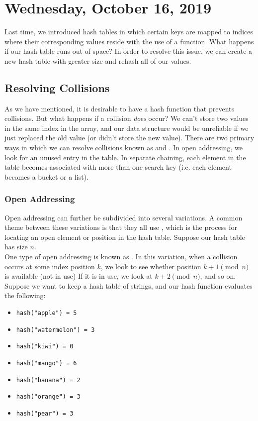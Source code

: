 \section{Wednesday, October 16, 2019}

Last time, we introduced hash tables in which certain keys are mapped to indices where their corresponding values reside with the use of a function. What happens if our hash table runs out of space? In order to resolve this issue, we can create a new hash table with greater size and rehash all of our values. 

\subsection{Resolving Collisions}

As we have mentioned, it is desirable to have a hash function that prevents collisions. But what happens if a collision \textit{does} occur? We can't store two values in the same index in the array, and our data structure would be unreliable if we just replaced the old value (or didn't store the new value). There are two primary ways in which we can resolve collisions known as  and . In open addressing, we look for an unused entry in the table. In separate chaining, each element in the table becomes associated with more than one search key (i.e. each element becomes a bucket or a list). \\

\subsubsection{Open Addressing}
Open addressing can further be subdivided into several variations. A common theme between these variations is that they all use , which is the process for locating an open element or position in the hash table. Suppose our hash table has size $n$. \\

\noindent One type of open addressing is known as . In this variation, when a collision occurs at some index position $k$, we look to see whether position $k + 1 \pmod{n}$ is available (not in use) If it is in use, we look at $k + 2 \pmod{n}$, and so on. Suppose we want to keep a hash table of strings, and our hash function evaluates the following:
\begin{itemize}
    \item \verb!hash("apple") = 5!
    \item \verb!hash("watermelon") = 3!
    \item \verb!hash("kiwi") = 0!
    \item \verb!hash("mango") = 6!
    \item \verb!hash("banana") = 2!
    \item \verb!hash("orange") = 3!
    \item \verb!hash("pear") = 3!
\end{itemize}


